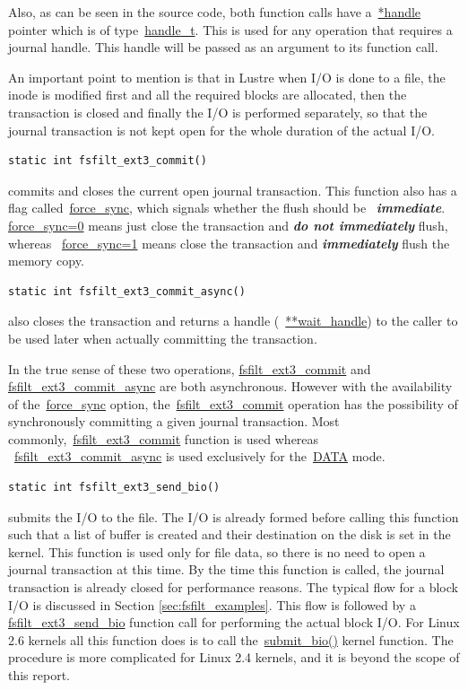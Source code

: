 Also, as can be seen in the source code, both function calls have
a~\url{*handle} pointer which is of type~\url{handle_t}. This is used for any
operation that requires a journal handle. This handle will be passed as an
argument to its function call.

An important point to mention is that in Lustre when I/O is done to a file,
the inode is modified first and all the required blocks are allocated, then the
transaction is closed and finally the I/O is performed separately, so that the
journal transaction is not kept open for the whole duration of the actual I/O. 

\begin{Verbatim} 
static int fsfilt_ext3_commit() 
\end{Verbatim} 

commits and closes the current open journal transaction. This function also has
a flag called~\url{force_sync}, which signals whether the flush should be
{~\bfseries{\em immediate}}. \url{force_sync=0} means just close the
transaction and {\bfseries{\em do not immediately}} flush, whereas
~\url{force_sync=1} means close the transaction and {\bfseries{\em
immediately}} flush the memory copy.

\begin{Verbatim}
static int fsfilt_ext3_commit_async() 
\end{Verbatim}

also closes the transaction and returns a handle (~\url{**wait_handle}) to
the caller to be used later when actually committing the transaction.

In the true sense of these two operations, \url{fsfilt_ext3_commit} and
\url{fsfilt_ext3_commit_async} are both asynchronous. However with the
availability of the~\url{force_sync} option, the~\url{fsfilt_ext3_commit}
operation has the possibility of synchronously committing a given journal
transaction. Most commonly,~\url{fsfilt_ext3_commit} function is used whereas
~\url{fsfilt_ext3_commit_async} is used exclusively for the~\url{DATA} mode.

\begin{Verbatim}
static int fsfilt_ext3_send_bio()
\end{Verbatim}

submits the I/O to the file. The I/O is already formed before calling this
function such that a list of buffer is created and their destination on the
disk is set in the kernel.  This function is used only for file data, so there
is no need to open a journal transaction at this time. By the time this
function is called, the journal transaction is already closed for performance
reasons. The typical flow for a block I/O is discussed in Section
\ref{sec:fsfilt_examples}. This flow is followed by a
\url{fsfilt_ext3_send_bio} function call for performing the actual block I/O.
For Linux 2.6 kernels all this function does is to call the~\url{submit_bio()}
kernel function. The procedure is more complicated for Linux 2.4 kernels, and it
is beyond the scope of this report.

